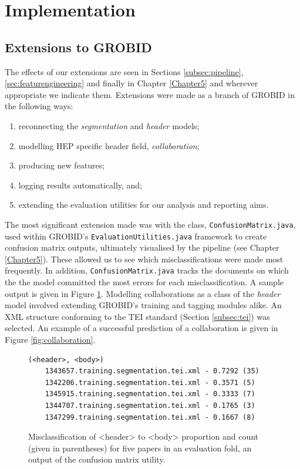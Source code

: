 \section{Implementation}
\subsection{Extensions to GROBID}
\label{subsec:extensions}

The effects of our extensions are seen in Sections \ref{subsec:pipeline}, \ref{sec:featurengineering} and finally in Chapter \ref{Chapter5} and wherever appropriate we indicate them. Extensions were made as a branch of GROBID in the following ways:

\begin{enumerate}
\item reconnecting the \emph{segmentation} and \emph{header} models;
\item modelling HEP specific header field, \emph{collaboration};
\item producing new features;
\item logging results automatically, and;
\item extending the evaluation utilities for our analysis and reporting aims.
\end{enumerate}

The most significant extension made was with the class, \texttt{ConfusionMatrix.java}, used within GROBID's \texttt{EvaluationUtilities.java} framework to create confusion matrix outputs, ultimately visualised by the pipeline (see Chapter \ref{Chapter5}). These allowed us to see which misclassifications were made most frequently. In addition, \texttt{ConfusionMatrix.java} tracks the documents on which the the model committed the most errors for each misclassification. A sample output is given in Figure \ref{fig:topk}. Modelling collaborations as a class of the \emph{header} model involved extending GROBID's training and tagging modules alike. An XML structure conforming to the TEI standard (Section \ref{subsec:tei}) was selected. An example of a successful prediction of a collaboration is given in Figure \ref{fig:collaboration}.

\begin{figure}[t]
\centering
\begin{BVerbatim}
(<header>, <body>)
	1343657.training.segmentation.tei.xml - 0.7292 (35)
	1342206.training.segmentation.tei.xml - 0.3571 (5)
	1345915.training.segmentation.tei.xml - 0.3333 (7)
	1344707.training.segmentation.tei.xml - 0.1765 (3)
	1347299.training.segmentation.tei.xml - 0.1667 (8)
\end{BVerbatim}
\caption{Misclassification of <header> to <body> proportion and count (given in parentheses) for five papers in an evaluation fold, an output of the confusion matrix utility.}
\label{fig:topk}
\end{figure}

